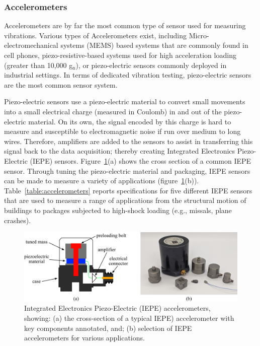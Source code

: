 \documentclass[12pt,letter]{article}
\begin{document}
\subsubsection{Accelerometers}

Accelerometers are by far the most common type of sensor used for measuring vibrations. Various types of Accelerometers exist, including Micro-electromechanical systems (MEMS) based systems that are commonly found in cell phones, piezo-resistive-based systems used for high acceleration loading (greater than 10,000 g$_\text{n}$), or piezo-electric sensors commonly deployed in industrial settings. In terms of dedicated vibration testing, piezo-electric sensors are the most common sensor system. 

Piezo-electric sensors use a piezo-electric material to convert small movements into a small electrical charge (measured in Coulomb) in and out of the piezo-electric material. On its own, the signal encoded by this charge is hard to measure and susceptible to electromagnetic noise if run over medium to long wires. Therefore, amplifiers are added to the sensors to assist in transferring this signal back to the data acquisition; thereby creating Integrated Electronics Piezo-Electric (IEPE) sensors. Figure~\ref{fig:accelerometers}(a) shows the cross section of a common IEPE sensor. Through tuning the piezo-electric material and packaging, IEPE sensors can be made to measure a variety of applications (figure~\ref{fig:accelerometers}(b)). Table~\ref{table:accelerometers} reports specifications for five different IEPE sensors that are used to measure a range of applications from the structural motion of buildings to packages subjected to high-shock loading (e.g., missals, plane crashes).

\begin{figure}[H]
    \centering
    \includegraphics[width=6.5in]{../figures/accelerometers}
    \caption{Integrated Electronics Piezo-Electric (IEPE) accelerometers, showing: (a) the cross-section of a typical IEPE) accelerometer with key components annotated, and; (b) selection of IEPE accelerometers for various applications.}
    \label{fig:accelerometers}
\end{figure} 
\end{document}

